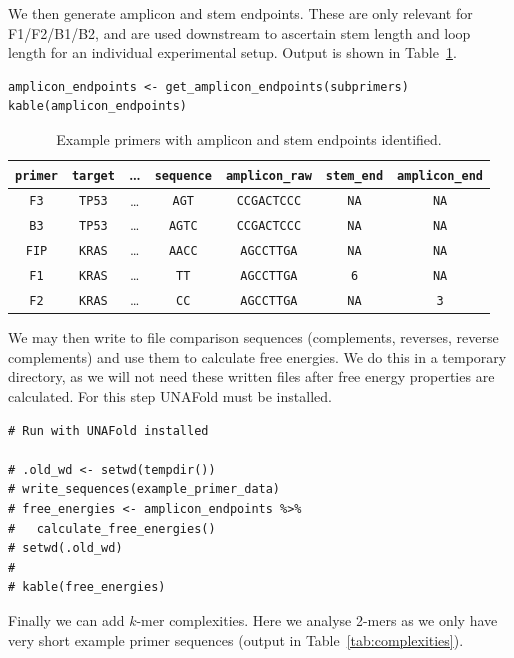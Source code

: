 \documentclass[../thesis.tex]{subfiles}
\begin{document}
We then generate amplicon and stem endpoints. These are only relevant for F1/F2/B1/B2, and are used downstream to ascertain stem length and loop length for an individual experimental setup. Output is shown in Table~\ref{tab:endpoints}.

\begin{lstlisting}
amplicon_endpoints <- get_amplicon_endpoints(subprimers)
kable(amplicon_endpoints)
\end{lstlisting}

\begin{table}[h!]
    \centering
    \begin{tabular}{c|c|c|c|c|c|c}
         \verb|primer| & \verb|target|    & \dots & \verb|sequence| & \verb|amplicon_raw| & \verb|stem_end| & \verb|amplicon_end| \\
         \hline
\verb|F3| &	\verb|TP53|	& 	\dots	& \verb|AGT|  &	\verb|CCGACTCCC|	& \verb|NA|  &	\verb|NA| \\
\verb|B3| &	\verb|TP53| & \dots  &	\verb|AGTC|	& \verb|CCGACTCCC| & \verb|NA|  &	\verb|NA| \\
\verb|FIP| &	\verb|KRAS|  &	\dots	& \verb|AACC|  &	\verb|AGCCTTGA|	& \verb|NA|  &	\verb|NA|\\
\verb|F1| &	\verb|KRAS| & \dots  &	\verb|TT|	& \verb|AGCCTTGA| & \verb|6|  &	\verb|NA| \\
\verb|F2| &	\verb|KRAS|  &	\dots	& \verb|CC|  &	\verb|AGCCTTGA|& \verb|NA|  &	\verb|3|	\\

    \end{tabular}
    \caption{Example primers with amplicon and stem endpoints identified.}
    \label{tab:endpoints}
\end{table}


We may then write to file comparison sequences (complements, reverses, reverse complements) and use them to calculate free energies. We do this in a temporary directory, as we will not need these written files after free energy properties are calculated. For this step UNAFold must be installed.

\begin{lstlisting}
# Run with UNAFold installed

# .old_wd <- setwd(tempdir())
# write_sequences(example_primer_data)
# free_energies <- amplicon_endpoints %>% 
#   calculate_free_energies() 
# setwd(.old_wd)
# 
# kable(free_energies)
\end{lstlisting}

Finally we can add $k$-mer complexities. Here we analyse 2-mers as we only have very short example primer sequences (output in Table~\ref{tab:complexities}).
\end{document}
